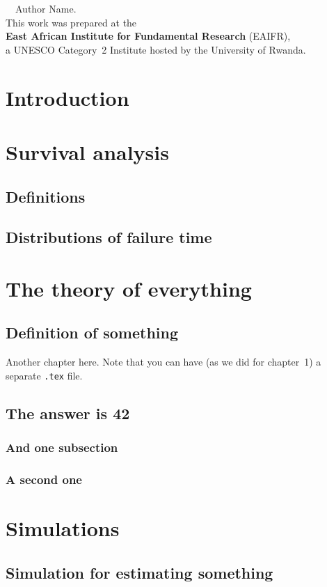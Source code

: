 \documentclass[12pt, a4paper, openany]{book}
\makeatletter
\newcommand{\thesisauthor}{Author Name}
\newcommand{\thesisyear}{\the\year}
\renewcommand\mainmatter{\clearpage\@mainmattertrue\pagenumbering{arabic}}
\renewcommand\backmatter{\clearpage\@mainmatterfalse}
\makeatother
\begin{document}
\thispagestyle{empty}
\vspace*{\fill}
\begin{center}
\textcopyright\ \thesisyear\ \thesisauthor.\\[0.3cm]
This work was prepared at the\\
\textbf{East African Institute for Fundamental Research} (EAIFR),\\
a UNESCO Category~2 Institute hosted by the University of Rwanda.
\end{center}
\vspace*{\fill}
\clearpage

\clearpage

\clearpage

\tableofcontents

\mainmatter
\chapter{Introduction}
\setcounter{page}{1}


\chapter{Survival analysis}
\section{Definitions}

\section{Distributions of failure time}


\chapter{The theory of everything}
\section{Definition of something}
Another chapter here. Note that you can have (as we did for chapter~1) a separate \texttt{.tex} file.
\section{The answer is 42}
\subsection{And one subsection}
\subsection{A second one}

\chapter{Simulations}
\section{Simulation for estimating something}


\backmatter


\end{document}
